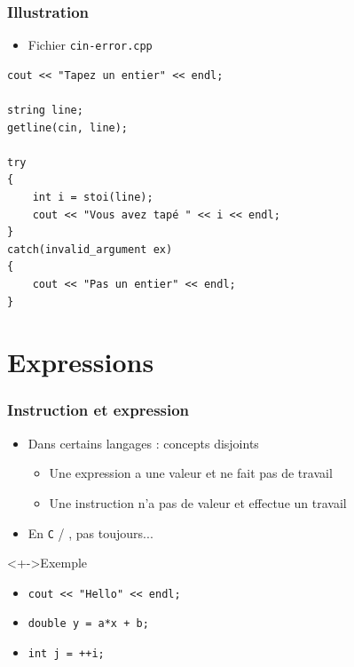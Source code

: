 \begin{frame}[containsverbatim]
\frametitle{Illustration}
\begin{itemize}
\item Fichier \texttt{cin-error.cpp}
\end{itemize}
\begin{lstlisting}
cout << "Tapez un entier" << endl;
        
string line;
getline(cin, line);
    
try
{
    int i = stoi(line);
    cout << "Vous avez tapé " << i << endl;
}
catch(invalid_argument ex)
{
    cout << "Pas un entier" << endl;
}
\end{lstlisting}
\end{frame}

\section{Expressions}

\begin{frame}
\frametitle{Instruction et expression}
\begin{itemize}[<+->]
\item Dans certains langages : concepts disjoints
	\begin{itemize}
	\item Une expression a une valeur et ne fait pas de travail
	\item Une instruction n'a pas de valeur et effectue un travail
	\end{itemize}
\item En \texttt{C} / \cpp, pas toujours...
\end{itemize}
\begin{exampleblock}<+->{Exemple}
	\begin{itemize}[<+->]
	\item \lstinline|cout << "Hello" << endl;|
	\item \lstinline|double y = a*x + b;|
	\item \lstinline|int j = ++i;|
	\end{itemize}
\end{exampleblock}
\end{frame}

